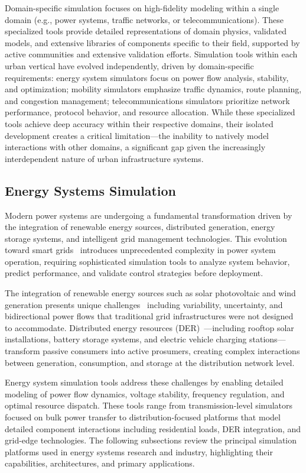 Domain-specific simulation focuses on high-fidelity modeling within a single domain (e.g., power systems, traffic networks, or telecommunications). These specialized tools provide detailed representations of domain physics, validated models, and extensive libraries of components specific to their field, supported by active communities and extensive validation efforts. Simulation tools within each urban vertical have evolved independently, driven by domain-specific requirements: energy system simulators focus on power flow analysis, stability, and optimization; mobility simulators emphasize traffic dynamics, route planning, and congestion management; telecommunications simulators prioritize network performance, protocol behavior, and resource allocation. While these specialized tools achieve deep accuracy within their respective domains, their isolated development creates a critical limitation—the inability to natively model interactions with other domains, a significant gap given the increasingly interdependent nature of urban infrastructure systems.



\subsection{Energy Systems Simulation}


Modern power systems are undergoing a fundamental transformation driven by the integration of renewable energy sources, distributed generation, energy storage systems, and intelligent grid management technologies. This evolution toward smart grids~\cite{smartgrid_challenges} introduces unprecedented complexity in power system operation, requiring sophisticated simulation tools to analyze system behavior, predict performance, and validate control strategies before deployment.

The integration of renewable energy sources such as solar photovoltaic and wind generation presents unique challenges~\cite{renewable_integration} including variability, uncertainty, and bidirectional power flows that traditional grid infrastructures were not designed to accommodate. Distributed energy resources (DER)~\cite{der_challenges}—including rooftop solar installations, battery storage systems, and electric vehicle charging stations—transform passive consumers into active prosumers, creating complex interactions between generation, consumption, and storage at the distribution network level.

Energy system simulation tools address these challenges by enabling detailed modeling of power flow dynamics, voltage stability, frequency regulation, and optimal resource dispatch. These tools range from transmission-level simulators focused on bulk power transfer to distribution-focused platforms that model detailed component interactions including residential loads, DER integration, and grid-edge technologies. The following subsections review the principal simulation platforms used in energy systems research and industry, highlighting their capabilities, architectures, and primary applications.

